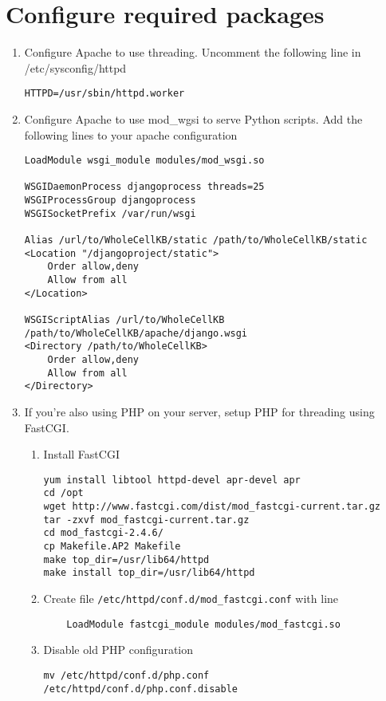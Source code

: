 \documentclass[twoside]{book}
\begin{document}
\section{Configure required packages}
\begin{enumerate}
\item Configure Apache to use threading. Uncomment the following line in /etc/sysconfig/httpd
\begin{verbatim}
HTTPD=/usr/sbin/httpd.worker
\end{verbatim}
		
\item Configure Apache to use mod\_wgsi to serve Python scripts. Add the following lines to your apache configuration
\begin{verbatim}
LoadModule wsgi_module modules/mod_wsgi.so

WSGIDaemonProcess djangoprocess threads=25
WSGIProcessGroup djangoprocess
WSGISocketPrefix /var/run/wsgi

Alias /url/to/WholeCellKB/static /path/to/WholeCellKB/static
<Location "/djangoproject/static">
	Order allow,deny
	Allow from all
</Location>

WSGIScriptAlias /url/to/WholeCellKB /path/to/WholeCellKB/apache/django.wsgi
<Directory /path/to/WholeCellKB>
	Order allow,deny
	Allow from all
</Directory>
\end{verbatim}
		
\item If you're also using PHP on your server, setup PHP for threading using FastCGI.
\begin{enumerate}
\item Install FastCGI
\begin{verbatim}
yum install libtool httpd-devel apr-devel apr
cd /opt
wget http://www.fastcgi.com/dist/mod_fastcgi-current.tar.gz
tar -zxvf mod_fastcgi-current.tar.gz
cd mod_fastcgi-2.4.6/
cp Makefile.AP2 Makefile
make top_dir=/usr/lib64/httpd
make install top_dir=/usr/lib64/httpd
\end{verbatim}

\item Create file \texttt{/etc/httpd/conf.d/mod\_fastcgi.conf} with line
\begin{verbatim}
	LoadModule fastcgi_module modules/mod_fastcgi.so
\end{verbatim}

\item Disable old PHP configuration
\begin{verbatim}
mv /etc/httpd/conf.d/php.conf /etc/httpd/conf.d/php.conf.disable
\end{verbatim}


\end{enumerate}
\end{enumerate}
\end{document}
